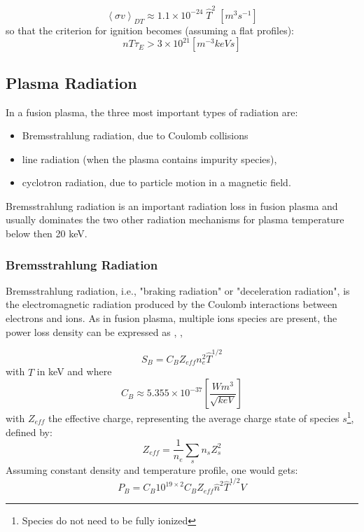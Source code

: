 \begin{equation}
\left< \sigma v \right>_{DT} 
\approx 
1.1 \times 10^{-24}\; \hat T^2 \;\si{\left[m^3 s^{-1}\right]}
\end{equation}
so that the criterion for ignition becomes (assuming a flat profiles): 
\begin{equation*}
    n T \tau_E > 3 \times 10^{21} \si{\left[m^{-3} keV s \right]}
\end{equation*}

\subsection{Plasma Radiation}
In a fusion plasma, the three most important types of radiation are: 
\begin{itemize}
	\item Bremsstrahlung radiation, due to Coulomb collisions 
	\item line radiation (when the plasma contains impurity species), 
	\item cyclotron radiation, due to particle motion in a magnetic field.
\end{itemize}

Bremsstrahlung radiation is an important radiation loss in fusion plasma and usually dominates the two other radiation mechanisms for plasma temperature below then 20 keV. 



\subsubsection{Bremsstrahlung Radiation}
Bremsstrahlung radiation, i.e., "braking radiation" or "deceleration radiation", is the electromagnetic radiation produced by the Coulomb interactions between electrons and ions. As in fusion plasma, multiple ions species are present, the power loss density can be expressed as \cite[sec.3.3]{FusionCEA1987}, \cite[sec.4.24]{Wesson2004}, \cite[sec.3.5.4]{Freidberg2007}

\begin{equation}
S_B
=
C_B Z_{eff} n_e^2 \hat T^{1/2}
\end{equation}
with $\hat T$ in keV and where 
\begin{equation*}
C_B 
\approx
5.355 \times 10^{-37} \left[ \frac{W m^3}{ \sqrt{keV}} \right]
\end{equation*}
with $Z_{eff}$ the effective charge, representing the average
charge state of species $s$\footnote{Species do not need to be fully ionized}, defined by:
\begin{equation}
Z_{eff}
=
\frac{1}{n_e}
\sum_s
n_s Z_s^2
\label{eq:effective_charge_adv}
\end{equation}
Assuming constant density and temperature profile, one would gets:
\begin{equation}
	P_B
	=
	C_B 10^{19\times 2} 
	C_B Z_{eff} \hat n^2 \hat T^{1/2}
	V
\label{eq:Bremsstrahlung_Power_Loss}
\end{equation}

